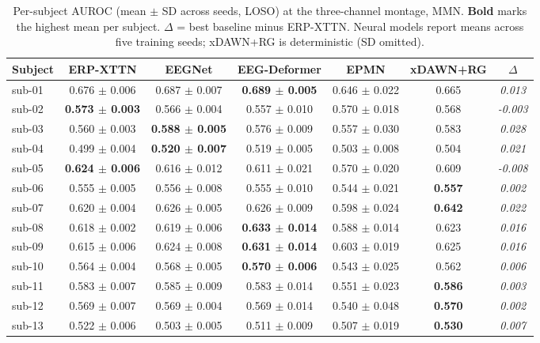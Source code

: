 \begin{table}[t]
\centering
\caption{Per-subject AUROC (mean $\pm$ SD across seeds, LOSO) at the three-channel montage, MMN. \textbf{Bold} marks the highest mean per subject. $\Delta$ = best baseline minus ERP-XTTN. Neural models report means across five training seeds; xDAWN+RG is deterministic (SD omitted).}
\label{sup:tab-persubj-mmn}
\begin{tabular}{lcccccc}
\toprule
Subject & ERP-XTTN & EEGNet & EEG-Deformer & EPMN & xDAWN+RG & $\Delta$ \\
\midrule
sub-01 & 0.676 $\pm$ 0.006 & 0.687 $\pm$ 0.007 & \textbf{0.689 $\pm$ 0.005} & 0.646 $\pm$ 0.022 & 0.665 & \textit{0.013} \\
sub-02 & \textbf{0.573 $\pm$ 0.003} & 0.566 $\pm$ 0.004 & 0.557 $\pm$ 0.010 & 0.570 $\pm$ 0.018 & 0.568 & \textit{-0.003} \\
sub-03 & 0.560 $\pm$ 0.003 & \textbf{0.588 $\pm$ 0.005} & 0.576 $\pm$ 0.009 & 0.557 $\pm$ 0.030 & 0.583 & \textit{0.028} \\
sub-04 & 0.499 $\pm$ 0.004 & \textbf{0.520 $\pm$ 0.007} & 0.519 $\pm$ 0.005 & 0.503 $\pm$ 0.008 & 0.504 & \textit{0.021} \\
sub-05 & \textbf{0.624 $\pm$ 0.006} & 0.616 $\pm$ 0.012 & 0.611 $\pm$ 0.021 & 0.570 $\pm$ 0.020 & 0.609 & \textit{-0.008} \\
sub-06 & 0.555 $\pm$ 0.005 & 0.556 $\pm$ 0.008 & 0.555 $\pm$ 0.010 & 0.544 $\pm$ 0.021 & \textbf{0.557} & \textit{0.002} \\
sub-07 & 0.620 $\pm$ 0.004 & 0.626 $\pm$ 0.005 & 0.626 $\pm$ 0.009 & 0.598 $\pm$ 0.024 & \textbf{0.642} & \textit{0.022} \\
sub-08 & 0.618 $\pm$ 0.002 & 0.619 $\pm$ 0.006 & \textbf{0.633 $\pm$ 0.014} & 0.588 $\pm$ 0.014 & 0.623 & \textit{0.016} \\
sub-09 & 0.615 $\pm$ 0.006 & 0.624 $\pm$ 0.008 & \textbf{0.631 $\pm$ 0.014} & 0.603 $\pm$ 0.019 & 0.625 & \textit{0.016} \\
sub-10 & 0.564 $\pm$ 0.004 & 0.568 $\pm$ 0.005 & \textbf{0.570 $\pm$ 0.006} & 0.543 $\pm$ 0.025 & 0.562 & \textit{0.006} \\
sub-11 & 0.583 $\pm$ 0.007 & 0.585 $\pm$ 0.009 & 0.583 $\pm$ 0.014 & 0.551 $\pm$ 0.023 & \textbf{0.586} & \textit{0.003} \\
sub-12 & 0.569 $\pm$ 0.007 & 0.569 $\pm$ 0.004 & 0.569 $\pm$ 0.014 & 0.540 $\pm$ 0.048 & \textbf{0.570} & \textit{0.002} \\
sub-13 & 0.522 $\pm$ 0.006 & 0.503 $\pm$ 0.005 & 0.511 $\pm$ 0.009 & 0.507 $\pm$ 0.019 & \textbf{0.530} & \textit{0.007} \\

\end{tabular}
\end{table}
